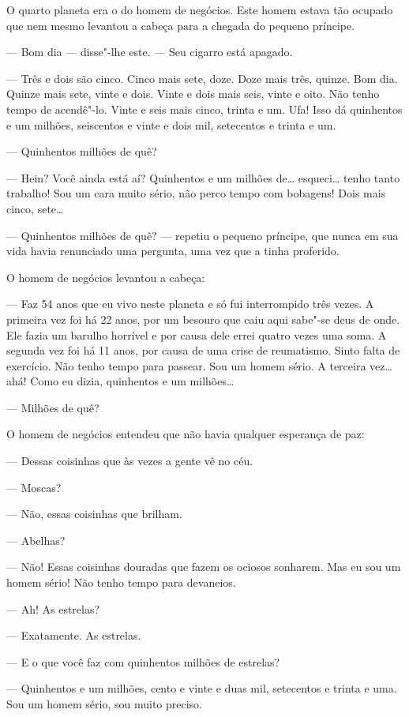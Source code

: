 \begin{Parallel}[p]{}{}
{O quarto planeta era o do homem de negócios. Este homem estava tão
ocupado que nem mesmo levantou a cabeça para a chegada do pequeno
príncipe.

--- Bom dia --- disse"-lhe este. --- Seu cigarro está apagado.

--- Três e dois são cinco. Cinco mais sete, doze. Doze mais três, quinze.
Bom dia. Quinze mais sete, vinte e dois. Vinte e dois mais seis, vinte e
oito. Não tenho tempo de acendê"-lo. Vinte e seis mais cinco, trinta e
um. Ufa! Isso dá quinhentos e um milhões, seiscentos e vinte e dois mil,
setecentos e trinta e um.

--- Quinhentos milhões de quê?

--- Hein? Você ainda está aí? Quinhentos e um milhões de\ldots{} esqueci\ldots{}
tenho tanto trabalho! Sou um cara muito sério, não perco tempo com
bobagens! Dois mais cinco, sete\ldots{}

--- Quinhentos milhões de quê? --- repetiu o pequeno príncipe, que nunca em
sua vida havia renunciado uma pergunta, uma vez que a tinha proferido.

O homem de negócios levantou a cabeça:

--- Faz 54 anos que eu vivo neste planeta e só fui interrompido três
vezes. A primeira vez foi há 22 anos, por um besouro que caiu aqui
sabe"-se deus de onde. Ele fazia um barulho horrível e por causa dele
errei quatro vezes uma soma. A segunda vez foi há 11 anos, por causa de
uma crise de reumatismo. Sinto falta de exercício. Não tenho tempo para
passear. Sou um homem sério. A terceira vez\ldots{} ahá! Como eu dizia,
quinhentos e um milhões\ldots{}

--- Milhões de quê?

O homem de negócios entendeu que não havia qualquer esperança de paz:

--- Dessas coisinhas que às vezes a gente vê no céu.

--- Moscas?

--- Não, essas coisinhas que brilham.

--- Abelhas?

--- Não! Essas coisinhas douradas que fazem os ociosos sonharem. Mas eu
sou um homem sério! Não tenho tempo para devaneios.

--- Ah! As estrelas?

--- Exatamente. As estrelas.

--- E o que você faz com quinhentos milhões de estrelas?

--- Quinhentos e um milhões, cento e vinte e duas mil, setecentos e trinta
e uma. Sou um homem sério, sou muito preciso.

}
\end{Parallel}
